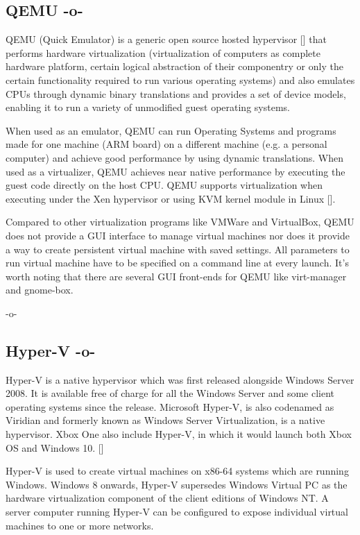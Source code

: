 \subsection{QEMU -o-}
     
QEMU (Quick Emulator) is a generic open source hosted
hypervisor [\cite{www-hypervisor}] that performs hardware virtualization
(virtualization of computers as complete hardware platform, certain
logical abstraction of their componentry or only the certain
functionality required to run various operating systems)
\cite{www-qemu} and also emulates CPUs through dynamic binary
translations and provides a set of device models, enabling it to run a
variety of unmodified guest operating systems.
     
When used as an emulator, QEMU can run Operating Systems and programs
made for one machine (ARM board) on a different machine (e.g. a
personal computer) and achieve good performance by using dynamic
translations.  When used as a virtualizer, QEMU achieves near native
performance by executing the guest code directly on the host CPU. QEMU
supports virtualization when executing under the Xen hypervisor or
using KVM kernel module in Linux [\cite{www-qemuwiki}].

Compared to other virtualization programs like VMWare and VirtualBox,
QEMU does not provide a GUI interface to manage virtual machines nor
does it provide a way to create persistent virtual machine with saved
settings. All parameters to run virtual machine have to be specified
on a command line at every launch. It's worth noting that there are
several GUI front-ends for QEMU like virt-manager and gnome-box.

     -o-

\subsection{Hyper-V -o-}
     
Hyper-V is a native hypervisor which was first released alongside
Windows Server 2008. It is available free of charge for all the
Windows Server and some client operating systems since the
release. Microsoft Hyper-V, is also codenamed as Viridian and formerly
known as Windows Server Virtualization, is a native hypervisor. Xbox
One also include Hyper-V, in which it would launch both Xbox OS and
Windows 10. [\cite{www-hyper-v-wikipedia}]

Hyper-V is used to create virtual machines on x86-64 systems which are
running Windows. Windows 8 onwards, Hyper-V supersedes Windows Virtual
PC as the hardware virtualization component of the client editions of
Windows NT. A server computer running Hyper-V can be configured to
expose individual virtual machines to one or more networks.

